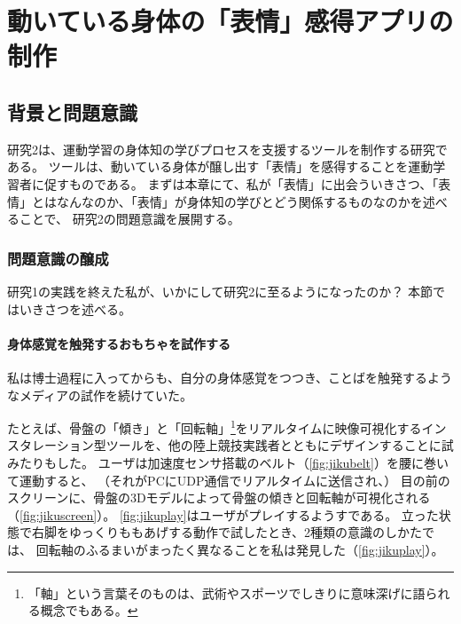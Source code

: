 \part{動いている身体の「表情」感得アプリの制作}

\chapter{背景と問題意識}
研究2は、運動学習の身体知の学びプロセスを支援するツールを制作する研究である。
ツールは、動いている身体が醸し出す「表情」を感得することを運動学習者に促すものである。
まずは本章にて、私が「表情」に出会ういきさつ、「表情」とはなんなのか、「表情」が身体知の学びとどう関係するものなのかを述べることで、
研究2の問題意識を展開する。

\section{問題意識の醸成}
\label{sec:tetsugakujousei}
研究1の実践を終えた私が、いかにして研究2に至るようになったのか？
本節ではいきさつを述べる。

\subsection{身体感覚を触発するおもちゃを試作する}
\label{subsec:toy}
私は博士過程に入ってからも、自分の身体感覚をつつき、ことばを触発するようなメディアの試作を続けていた。

たとえば、骨盤の「傾き」と「回転軸」\footnote{
  「軸」という言葉そのものは、武術やスポーツでしきりに意味深げに語られる概念でもある。
}をリアルタイムに映像可視化するインスタレーション型ツールを、他の陸上競技実践者とともにデザインすることに試みたりもした\cite{horiuchi_suwa:2020b}。
ユーザは加速度センサ搭載のベルト（\autoref{fig:jikubelt}）を腰に巻いて運動すると、
（それがPCにUDP通信でリアルタイムに送信され、）
目の前のスクリーンに、骨盤の3Dモデルによって骨盤の傾きと回転軸が可視化される（\autoref{fig:jikuscreen}）。
\autoref{fig:jikuplay}はユーザがプレイするようすである。
立った状態で右脚をゆっくりももあげする動作で試したとき、2種類の意識のしかたでは、
回転軸のふるまいがまったく異なることを私は発見した（\autoref{fig:jikuplay}）。

